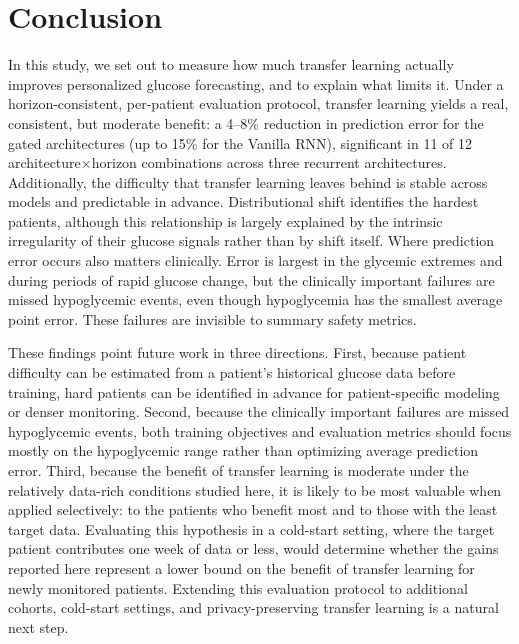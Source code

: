 \documentclass[conference]{IEEEtran}
\begin{document}
\section{Conclusion}
\label{sec:conclusion}
In this study, we set out to measure how much transfer learning actually improves personalized
glucose forecasting, and to explain what limits it. Under a horizon-consistent, per-patient evaluation protocol, transfer learning yields a real, consistent, but moderate benefit: a 4--8\% reduction in prediction error for the gated architectures (up to 15\% for the Vanilla RNN), significant in 11 of 12 architecture$\times$horizon combinations across three recurrent architectures. Additionally, the difficulty that transfer learning leaves
behind is stable across models and predictable in advance. Distributional shift identifies the hardest patients, although this relationship is largely explained by the intrinsic irregularity of their glucose signals rather than by shift itself. Where prediction error occurs also matters clinically. Error is largest in the glycemic extremes and during periods of rapid glucose change, but the clinically important failures are missed hypoglycemic events, even though hypoglycemia has the smallest average point error. These failures are invisible to summary safety metrics. 

These findings point future work in three directions. First, because patient difficulty can be estimated from a patient's historical glucose data before training, hard patients can be identified in advance for patient-specific modeling or denser monitoring. Second, because the clinically important failures are missed hypoglycemic events, both training objectives and evaluation metrics should focus mostly on the hypoglycemic range rather than optimizing average prediction error. Third, because the benefit of transfer learning is moderate under the relatively data-rich conditions studied here, it is likely to be most valuable when applied selectively: to the patients who benefit most and to those with the least target data. Evaluating this hypothesis in a cold-start setting, where the target patient contributes one week of data or less, would determine whether the gains reported here represent a lower bound on the benefit of transfer learning for newly monitored patients. Extending this evaluation protocol to additional cohorts, cold-start settings, and privacy-preserving transfer learning is a natural next step.
\end{document}
